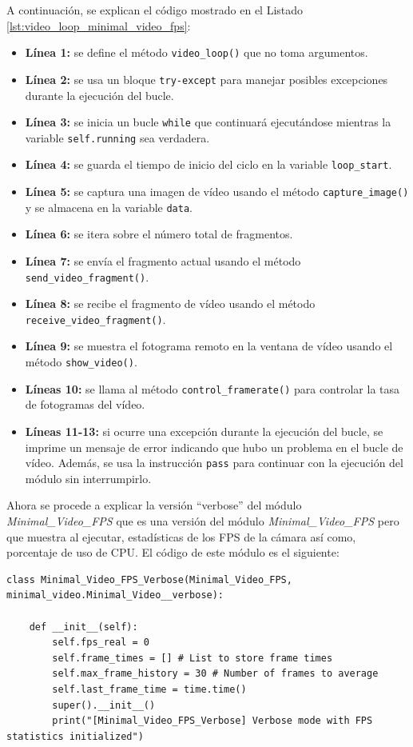 A continuación, se explican el código mostrado en el Listado \ref{lst:video_loop_minimal_video_fps}:

\begin{itemize}
    \item \textbf{Línea 1:} se define el método \texttt{video\_loop()} que no toma argumentos.
    \item \textbf{Línea 2:} se usa un bloque \texttt{try-except} para manejar posibles excepciones durante la ejecución del bucle.
    \item \textbf{Línea 3:} se inicia un bucle \texttt{while} que continuará ejecutándose mientras la variable \texttt{self.running} sea verdadera.
    \item \textbf{Línea 4:} se guarda el tiempo de inicio del ciclo en la variable \texttt{loop\_start}.
    \item \textbf{Línea 5:} se captura una imagen de vídeo usando el método \texttt{capture\_image()} y se almacena en la variable \texttt{data}.
    \item \textbf{Línea 6:} se itera sobre el número total de fragmentos.
    \item \textbf{Línea 7:} se envía el fragmento actual usando el método \texttt{send\_video\_fragment()}.
    \item \textbf{Línea 8:} se recibe el fragmento de vídeo usando el método \texttt{receive\_video\_fragment()}.
    \item \textbf{Línea 9:} se muestra el fotograma remoto en la ventana de vídeo usando el método \texttt{show\_video()}.
    \item \textbf{Líneas 10:} se llama al método \texttt{control\_framerate()} para controlar la tasa de fotogramas del vídeo.
    \item \textbf{Líneas 11-13:} si ocurre una excepción durante la ejecución del bucle, se imprime un mensaje de error indicando que hubo un problema en el bucle de vídeo. Además, se usa la instrucción \texttt{pass} para continuar con la ejecución del módulo sin interrumpirlo.
\end{itemize}
\vspace{\baselineskip}

Ahora se procede a explicar la versión ``verbose'' del módulo \textit{Minimal\_Video\_FPS} que es una versión del módulo \textit{Minimal\_Video\_FPS} pero que muestra al ejecutar, estadísticas de los FPS de la cámara así como, porcentaje de uso de CPU. El código de este módulo es el siguiente:
\begin{lstlisting}[style=pythonstyle, caption={Comienzo del módulo Minimal\_Video\_FPS\_Verbose y su inicialización.}, label={lst:comienzo_minimal_video_fps_verbose}]
class Minimal_Video_FPS_Verbose(Minimal_Video_FPS, minimal_video.Minimal_Video__verbose):

    def __init__(self):
        self.fps_real = 0
        self.frame_times = [] # List to store frame times
        self.max_frame_history = 30 # Number of frames to average
        self.last_frame_time = time.time() 
        super().__init__()
        print("[Minimal_Video_FPS_Verbose] Verbose mode with FPS statistics initialized")
\end{lstlisting}
\vspace{\baselineskip}

